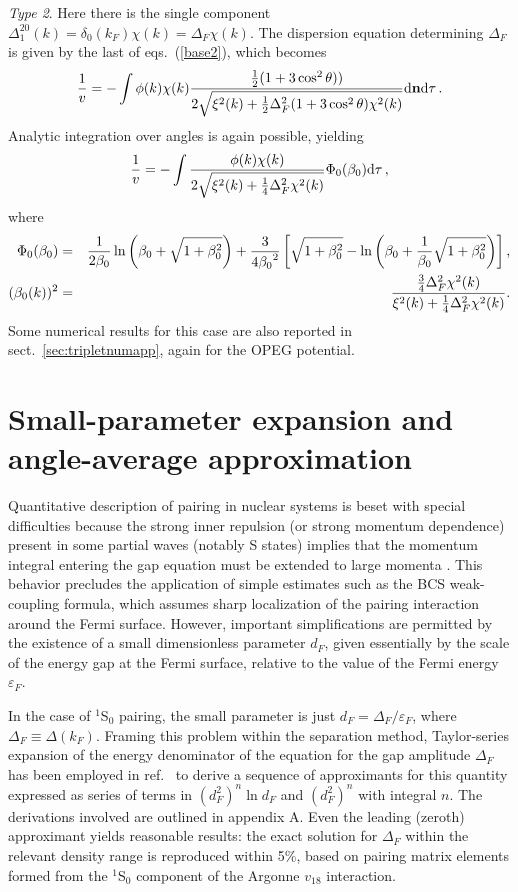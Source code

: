 {\it Type 2}.  Here there is the single component
$\Delta_1^{20}(k)=\delta_0(k_F) \chi(k)= \Delta_F \chi(k)$.
The dispersion equation determining $\Delta_F$ is given by the last of
eqs.~(\ref{base2}), which becomes
\begin{equation}
{1\over v}=- \int \phi(k)\chi(k) {{1\over 2}(1 + 3 \cos^2\theta))\over
2\sqrt{\xi^2(k) + {1\over 2}\Delta_F^2(1 + 3\cos^2\theta)\chi^2(k)} }
{\rm d}{\bf n} {\rm d} \tau \, .
\label{mzero}
\end{equation}
Analytic integration over angles is again possible, yielding
\begin{equation}
 {1\over v} =-  \int  \frac{\phi(k)\chi(k) }{2\sqrt{\xi^2(k) +
   {1\over 4}   \Delta_F^2\chi^2(k)}}\Phi_0(\beta_0){\rm d}\tau \, ,
\label{eqtype2}
\end{equation}
where
\begin{eqnarray}
\Phi_0(\beta_0) &=&
\frac{1}{2\beta_0} \ln\left(\beta_0 + \sqrt{1 + \beta_0^2}\right)
 +  \frac{3}{4{\beta_0}^2}\left[\sqrt{1 + \beta_0^2}
- \ln\left(\beta_0 + \frac{1}{\beta_0}\sqrt{1 + \beta_0^2}\right)\right],
\nonumber \\
(\beta_0(k))^2 &=& {{3\over 4}\Delta_F^2\chi^2(k)\over
	\xi^2(k) + {1\over 4}\Delta_F^2\chi^2(k)} .
\end{eqnarray}
Some numerical results for this case are also reported in 
sect.~\ref{sec:tripletnumapp}, again for the OPEG potential.

\section{Small-parameter expansion and angle-average approximation
\label{sec:aaa}}

Quantitative description of pairing in nuclear systems is beset with 
special difficulties because the strong inner repulsion (or strong 
momentum dependence) present in some partial waves (notably S states)
implies that the momentum integral entering the gap equation
must be extended to large momenta \cite{baldo1,ccdk,kkc}.  This
behavior precludes the application of simple estimates such as
the BCS weak-coupling formula, which assumes sharp localization of the
pairing interaction around the Fermi surface.  However, important
simplifications are permitted by the existence of a small dimensionless
parameter $d_F$, given essentially by the scale of the energy gap
at the Fermi surface, relative to the value of the Fermi energy
$\varepsilon_F$.

In the case of $^1$S$_0$ pairing, the small parameter is just
$d_F = \Delta_F/\varepsilon_F$, where $\Delta_F\equiv \Delta(k_F)$.
Framing this problem within the separation method, Taylor-series
expansion of the energy denominator
of the equation for the gap amplitude $\Delta_F$ has
been employed in ref.~\cite{luso} to derive a sequence of approximants
for this quantity expressed as series of terms in
$(d_F^2)^n \ln d_F$ and $(d_F^2)^n$ with integral $n$.  The derivations 
involved are outlined in appendix A.  Even the leading (zeroth) 
approximant yields reasonable results: the exact solution for 
$\Delta_F$ within the relevant density range is reproduced within 
5\%, based on pairing matrix elements formed from the $^1$S$_0$ 
component of the Argonne $v_{18}$ interaction.

